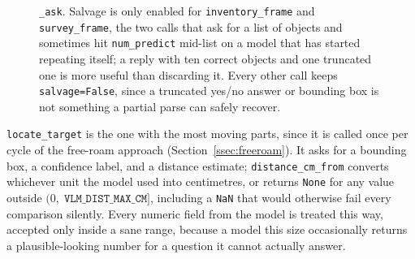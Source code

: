 \begin{figure}[htbp]
  \centering
  \caption{\texttt{\_ask}. Salvage is only enabled for \texttt{inventory\_frame} and \texttt{survey\_frame}, the two calls that ask for a list of objects and sometimes hit \texttt{num\_predict} mid-list on a model that has started repeating itself; a reply with ten correct objects and one truncated one is more useful than discarding it. Every other call keeps \texttt{salvage=False}, since a truncated yes/no answer or bounding box is not something a partial parse can safely recover.}
  \label{fig:flow-vlm}
\end{figure}

\texttt{locate\_target} is the one with the most moving parts, since it is
called once per cycle of the free-roam approach (Section~\ref{ssec:freeroam}).
It asks for a bounding box, a confidence label, and a distance estimate;
\texttt{distance\_cm\_from} converts whichever unit the model used into
centimetres, or returns \texttt{None} for any value outside
\((0,\;\texttt{VLM\_DIST\_MAX\_CM}]\), including a \texttt{NaN} that would
otherwise fail every comparison silently. Every numeric field from the model
is treated this way, accepted only inside a sane range, because a model this
size occasionally returns a plausible-looking number for a question it
cannot actually answer.

